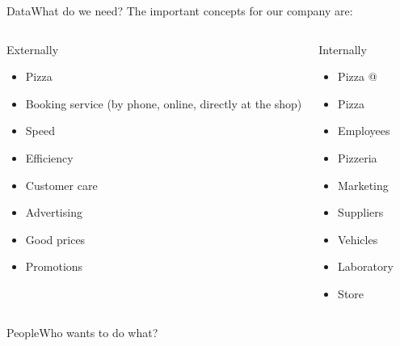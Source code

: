 \documentclass{beamer}
\begin{document}
\begin{frame}{Data}{What do we need?}
The important concepts for our company are:
\begin{columns}
 \begin{block}{Externally}
  \begin{itemize}
 \item Pizza
 \item Booking service (by phone, online, directly at the shop)
 \item Speed
 \item Efficiency
 \item Customer care
 \item Advertising
 \item Good prices
 \item Promotions
\end{itemize}
\end{block}
\begin{block}{Internally}
\begin{itemize}
 \item Pizza @
 \item Pizza
 \item Employees
 \item Pizzeria
 \item Marketing
 \item Suppliers
 \item Vehicles
 \item Laboratory
 \item Store
\end{itemize}
\end{block}
\end{columns}
\end{frame}

\begin{frame}{People}{Who wants to do what?}
\end{frame}
\end{document}
